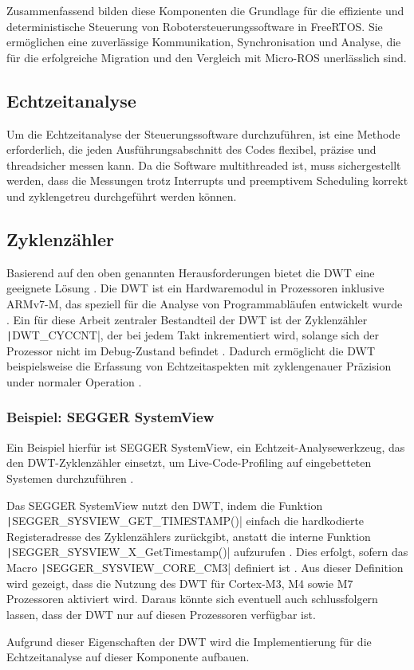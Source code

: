 Zusammenfassend bilden diese Komponenten die Grundlage für die effiziente und
deterministische Steuerung von Robotersteuerungssoftware in FreeRTOS. Sie
ermöglichen eine zuverlässige Kommunikation, Synchronisation und Analyse, die
für die erfolgreiche Migration und den Vergleich mit Micro-ROS unerlässlich
sind.

\subsection{Echtzeitanalyse}

Um die Echtzeitanalyse der Steuerungssoftware durchzuführen, ist eine Methode
erforderlich, die jeden Ausführungsabschnitt des Codes flexibel, präzise und
threadsicher messen kann. Da die Software multithreaded ist, muss sichergestellt
werden, dass die Messungen trotz Interrupts und preemptivem Scheduling korrekt
und zyklengetreu durchgeführt werden können.

\subsection{Zyklenzähler}

Basierend auf den oben genannten Herausforderungen bietet die \ac{DWT} eine
geeignete Lösung \cite{ARM_KA001499}. Die DWT ist ein Hardwaremodul in
Prozessoren inklusive ARMv7-M, das speziell für die Analyse von
Programmabläufen entwickelt wurde \cite{ARMv7_ref_man_dwt_profiling}. Ein für
diese Arbeit zentraler Bestandteil der DWT ist der Zyklenzähler
\texttt|DWT_CYCCNT|, der bei jedem Takt inkrementiert wird, solange sich
der Prozessor nicht im Debug-Zustand befindet \cite{ARMv7_ref_man_dwt_cycle}.
Dadurch ermöglicht die DWT beispielsweise die Erfassung von Echtzeitaspekten mit
zyklengenauer Präzision under normaler Operation \cite{ARMv7_ref_man_dwt}.

\subsubsection{Beispiel: SEGGER SystemView}

Ein Beispiel hierfür ist SEGGER SystemView, ein Echtzeit-Analysewerkzeug, das
den DWT-Zyklenzähler einsetzt, um Live-Code-Profiling auf eingebetteten Systemen
durchzuführen \cite{SEGGER_SystemView}.

Das SEGGER SystemView nutzt den DWT, indem die Funktion \linebreak
\texttt|SEGGER_SYSVIEW_GET_TIMESTAMP()| einfach die hardkodierte
Registeradresse des Zyklenzählers zurückgibt, anstatt die interne Funktion
\texttt|SEGGER_SYSVIEW_X_GetTimestamp()| aufzurufen
\cite{SystemView_Config, Arm_DWT_Programmers_Model}. Dies erfolgt, sofern das
Macro \texttt|SEGGER_SYSVIEW_CORE_CM3| definiert ist
\cite{SystemView_Config_79}. Aus dieser Definition wird gezeigt, dass die
Nutzung des DWT für Cortex-M3, M4 sowie M7 Prozessoren aktiviert wird. Daraus
könnte sich eventuell auch schlussfolgern lassen, dass der DWT nur auf diesen
Prozessoren verfügbar ist.

Aufgrund dieser Eigenschaften der DWT wird die Implementierung für die
Echtzeitanalyse auf dieser Komponente aufbauen.
